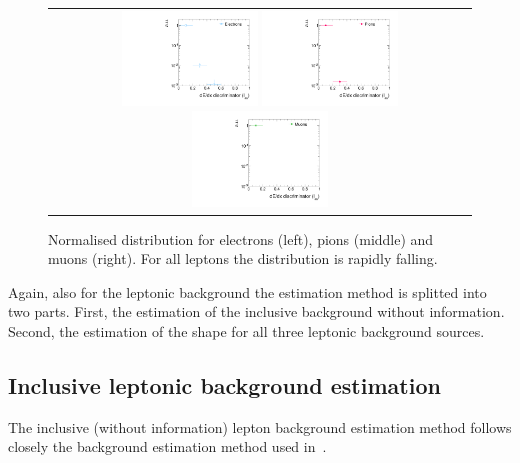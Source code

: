 \begin{figure}[!tb]
  \centering 
  \vspace{25pt}
  \begin{tabular}{c}
    \includegraphics[width=0.33\textwidth]{figures/analysis/IasDistributionForElecs.pdf}
    \includegraphics[width=0.33\textwidth]{figures/analysis/IasDistributionForPions.pdf}
    \includegraphics[width=0.33\textwidth]{figures/analysis/IasDistributionForMuons.pdf}
  \end{tabular}
  \caption{Normalised \ias distribution for electrons (left), pions (middle) and muons (right). 
           For all leptons the \ias distribution is rapidly falling.}
  \label{fig:IasDist}
\vspace{25pt}
\end{figure}


Again, also for the leptonic background the estimation method is splitted into two parts.
First, the estimation of the inclusive background without \ias information.
Second, the estimation of the \ias shape for all three leptonic background sources.


\subsection*{Inclusive leptonic background estimation}
The inclusive (without \ias information) lepton background estimation method follows closely the background estimation method used in~\cite{bib:CMS:DT_Thesis,bib:CMS:DT_8TeV_AN}.

